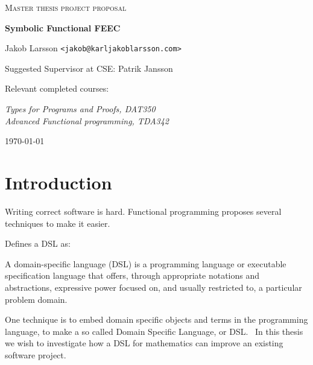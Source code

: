\documentclass{scrartcl}
\begin{document}
\begin{titlepage}

\centering
{\scshape\LARGE Master thesis project proposal}

\vspace{0.5cm}
{\huge\bfseries Symbolic Functional FEEC}

\vspace{2cm}
{\Large Jakob Larsson \texttt{<jakob@karljakoblarsson.com>}}

\vspace{1.0cm}
{\large Suggested Supervisor at CSE: Patrik Jansson }

\vspace{1.5cm}
{\large Relevant completed courses:}

{\itshape
Types for Programs and Proofs, DAT350 \\
Advanced Functional programming, TDA342 \\
}

\vfill
{\large \today}

\end{titlepage}


%
%

\section{Introduction}


Writing correct software is hard.
Functional programming proposes several techniques to make it easier.

\cite{van2000domain} Defines a DSL as:

\begin{displayquote}
  A domain-specific language (DSL) is a programming language or executable
  specification language that offers, through appropriate notations and
  abstractions, expressive power focused on, and usually restricted to,
  a particular problem domain.
\end{displayquote}

One technique is to embed domain specific objects and terms in the programming
language, to make a so called Domain Specific Language, or DSL.~\cite{van2000domain}
In this thesis we wish to investigate how a DSL
for mathematics can improve an existing software project.
\end{document}
